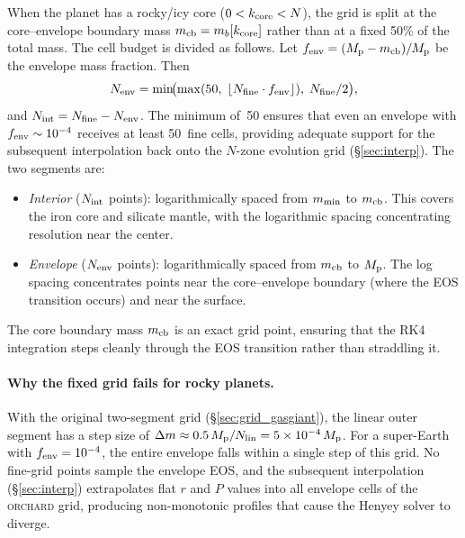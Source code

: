 \documentclass{aastex631}
\newcommand{\Mpl}{M_{\rm p}}
\newcommand{\orchard}{\textsc{orchard}}
\begin{document}
When the planet has a rocky/icy core ($0 < k_{\rm core} < N$), the grid
is split at the core--envelope boundary mass $m_{\rm cb} = m_b[k_{\rm
core}]$ rather than at a fixed 50\% of the total mass.  The cell budget
is divided as follows.  Let $f_{\rm env} = (\Mpl - m_{\rm cb}) / \Mpl$
be the envelope mass fraction.  Then
\begin{equation}\label{eq:Nenv}
  N_{\rm env} = \min\!\bigl(\max(50,\;
    \lfloor N_{\rm fine} \cdot f_{\rm env}\rfloor),\;
    N_{\rm fine}/2\bigr),
\end{equation}
and $N_{\rm int} = N_{\rm fine} - N_{\rm env}$.  The minimum of~50
ensures that even an envelope with $f_{\rm env} \sim 10^{-4}$ receives
at least 50~fine cells, providing adequate support for the subsequent
interpolation back onto the $N$-zone evolution grid
(\S\ref{sec:interp}).  The two segments are:
\begin{itemize}
  \item \emph{Interior} ($N_{\rm int}$ points): logarithmically spaced
    from $m_{\rm min}$ to $m_{\rm cb}$.  This covers the iron core and
    silicate mantle, with the logarithmic spacing concentrating
    resolution near the center.
  \item \emph{Envelope} ($N_{\rm env}$ points): logarithmically spaced
    from $m_{\rm cb}$ to $\Mpl$.  The log spacing concentrates points
    near the core--envelope boundary (where the EOS transition occurs)
    and near the surface.
\end{itemize}
The core boundary mass $m_{\rm cb}$ is an exact grid point, ensuring
that the RK4 integration steps cleanly through the EOS transition rather
than straddling it.

\paragraph{Why the fixed grid fails for rocky planets.}
With the original two-segment grid (\S\ref{sec:grid_gasgiant}), the
linear outer segment has a step size of $\Delta m \approx 0.5\,\Mpl /
N_{\rm lin} = 5 \times 10^{-4}\,\Mpl$.  For a super-Earth with
$f_{\rm env} = 10^{-4}$, the entire envelope falls within a single step
of this grid.  No fine-grid points sample the envelope EOS, and the
subsequent interpolation (\S\ref{sec:interp}) extrapolates flat $r$ and
$P$ values into all envelope cells of the \orchard{} grid, producing
non-monotonic profiles that cause the Henyey solver to diverge.

\end{document}
